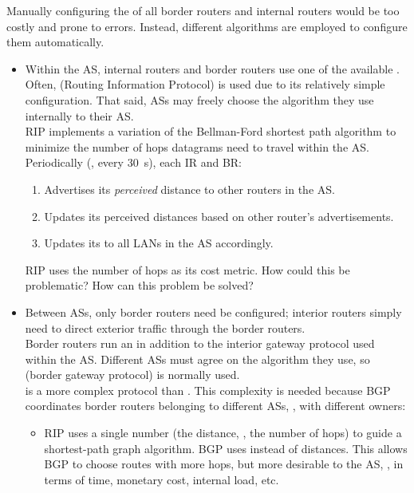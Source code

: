 Manually configuring the  of all border routers and internal routers
would be too costly and prone to errors. Instead, different algorithms are employed to configure them automatically.
\begin{itemize}
\item Within the AS, internal routers and border routers use one of the available 
.
Often,  (Routing Information Protocol) is used due to its relatively simple configuration.
That said, ASs may freely choose the algorithm they use internally to their AS.\\[-0.2cm]

RIP implements a variation of the Bellman-Ford shortest path algorithm to minimize the number of hops
datagrams need to travel within the AS. Periodically (\eg, every $30$~s), each IR and BR:\\[-0.4cm]
% 
  \begin{enumerate}
  \item Advertises its \textit{perceived} distance to other routers in the AS.
  \item Updates its perceived distances based on other router's advertisements.
  \item Updates its  to all LANs in the AS accordingly.
  \end{enumerate}

\begin{exercise}
RIP uses the number of hops as its cost metric.
% 
How could this be problematic?
% 
How can this problem be solved?
\end{exercise}

\vspace{0.25cm}
\item Between ASs, only border routers need be configured; interior routers simply need to direct 
exterior traffic through the border routers. \\[-0.3cm]

Border routers run an  in addition to the 
interior gateway protocol used within the AS. Different ASs must agree on the 
algorithm they use, so  (border gateway protocol) is normally used.\\[-0.3cm]

 is a more complex protocol than . This complexity 
is needed because BGP coordinates border routers belonging to different ASs, \ie, 
with different owners:\\[-0.4cm]
\begin{itemize}
\item RIP uses a single number (the distance, \ie, the number of hops)
to guide a shortest-path graph algorithm. BGP uses  instead of distances.
This allows BGP to choose routes with more hops, but more desirable to the AS,
\eg, in terms of time, monetary cost, internal load, etc.\\[-0.4cm]


\end{itemize}
\end{itemize}
